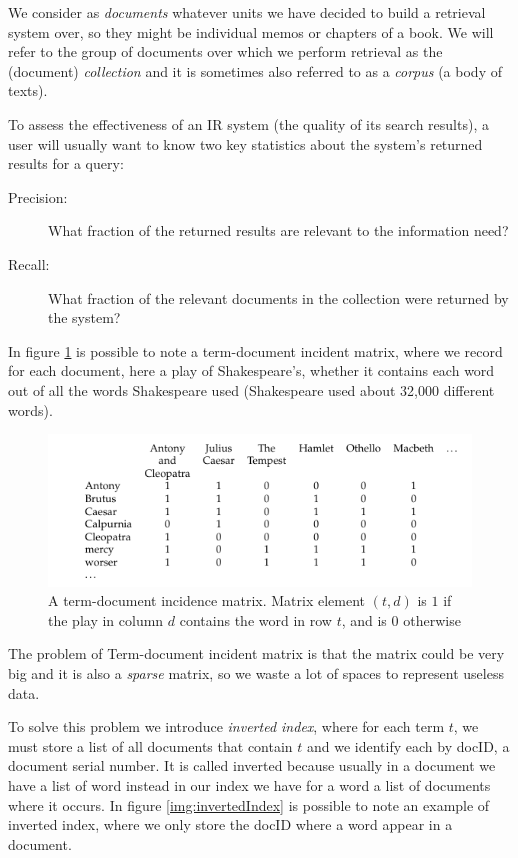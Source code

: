 We consider as \emph{documents} whatever units we have
decided to build a retrieval system over, so they might be individual memos or chapters of a book.\newline
We will refer to the group of documents over which we perform retrieval as the
(document) \emph{collection} and it is sometimes also referred to as a \emph{corpus} (a body of texts).

To assess the effectiveness of an IR system (the quality of its search results), a user will usually want
to know two key statistics about the system’s returned results for a query:
\begin{description}
    \item [Precision: ] What fraction of the returned results are relevant to the information need?
    \item [Recall: ]    What fraction of the relevant documents in the collection were returned by the system?
\end{description}

In figure \ref{img:booleanMatrix} is possible to note a term-document incident matrix, where we 
record for each document, here a play of Shakespeare’s, whether it contains each word 
out of all the words Shakespeare used (Shakespeare used about 32,000 different words).

\begin{figure}
    \caption{A term-document incidence matrix. Matrix element $(t, d)$ is $1$ if the play in column $d$
             contains the word in row $t$, and is $0$ otherwise}
    \label{img:booleanMatrix}
    \includegraphics[width=\textwidth]{Images/booleanMatrix}
\end{figure}
The problem of Term-document incident matrix is that the matrix could be very big and it is also a \emph{sparse}
matrix, so we waste a lot of spaces to represent useless data.

To solve this problem we introduce \emph{inverted index}, where for each term $t$, we must store a list 
of all documents that contain $t$ and we identify each by docID, a document serial number.\newline
It is called inverted because usually in a document we have a list of word instead in our index we have 
for a word a list of documents where it occurs.\newline
In figure \ref{img:invertedIndex} is possible to note an example of inverted index, where we only store the docID
where a word appear in a document.

